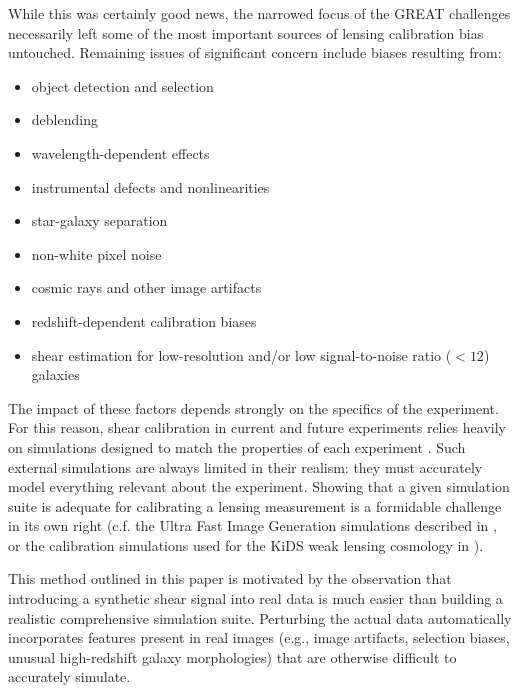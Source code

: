 \documentclass[iop]{emulateapj}
\newcommand\rmcomment[1]{\textcolor{red}{(RM: #1)}}
\begin{document}
While this was certainly good news, the narrowed focus of the GREAT
challenges necessarily left some of the most important sources of
lensing calibration bias untouched. Remaining issues of significant
concern include biases resulting from:
\begin{itemize}
\item object detection and selection
\item deblending
\item wavelength-dependent effects
\item instrumental defects and nonlinearities
\item star-galaxy separation
\item non-white pixel noise
\item cosmic rays and other image artifacts
\item redshift-dependent calibration biases
\item shear estimation for low-resolution and/or low signal-to-noise ratio ($<12$) galaxies
\end{itemize}
The impact of these factors depends strongly on the specifics of the
experiment. For this reason, shear calibration in current and future
experiments relies heavily on simulations designed to match the
properties of each experiment
\citep{KiDS450,2016MNRAS.tmp..827J}. Such external
simulations are always limited in their realism: they must accurately
model everything relevant about the experiment. Showing that a given
simulation suite is adequate for calibrating a lensing measurement is
a formidable challenge in its own right (c.f. the Ultra Fast Image
Generation simulations described in \citealt{2013A&C.....1...23B}, or
the calibration simulations used for the KiDS weak lensing cosmology
in \citealt{2016arXiv160605337F}).

This method outlined in this paper is motivated by the observation
that introducing a synthetic shear signal into real data is much
easier than building a realistic comprehensive simulation
suite. Perturbing the actual data automatically incorporates features
present in real images (e.g., image artifacts, selection biases,
unusual high-redshift galaxy morphologies) that are otherwise
difficult to accurately simulate.

\end{document}
